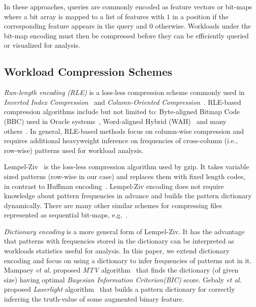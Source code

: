 In these approaches, queries are commonly encoded as feature vectors or bit-maps where a bit array is mapped to a list of features with $1$ in a position if the corresponding feature appears in the query and $0$ otherwise.
Workloads under the bit-map encoding must then be compressed before they can be efficiently queried or visualized for analysis. 
\subsection{Workload Compression Schemes}
\textit{Run-length encoding (RLE)} is a loss-less compression scheme commonly used in \textit{Inverted Index Compression}~\cite{DBLP:books/nostrand/WittenMT94,DBLP:journals/csur/ZobelM06} and \textit{Column-Oriented Compression}~\cite{DBLP:conf/sigmod/AbadiMF06}.
RLE-based compression algorithms include but not limited to: Byte-aligned Bitmap Code (BBC) used in Oracle systems~\cite{DBLP:journals/vldb/AntoshenkovZ96}, Word-aligned Hybrid (WAH)~\cite{DBLP:conf/ssdbm/WuOS02} and many others~\cite{DBLP:journals/acj/MoffatZ94,DBLP:conf/vldb/JohnsonA00,Antoshenkov:1995:BBC:874051.874730}.
In general, RLE-based methods focus on column-wise compression and requires additional heavyweight inference on frequencies of cross-column (i.e., row-wise) patterns used for workload analysis.

Lempel-Ziv~\cite{DBLP:journals/tit/ZivL77,DBLP:journals/tit/ZivL78} is the loss-less compression algorithm used by gzip.
It takes variable sized patterns (row-wise in our case) and replaces them with fixed length codes, in contrast to Huffman encoding~\cite{4051119}. 
Lempel-Ziv encoding does not require knowledge about pattern frequencies in advance and builds the pattern dictionary dynamically. 
There are many other similar schemes for compressing files represented as sequential bit-maps, e.g.~\cite{DBLP:conf/adbis/SkibinskiS07a}.

\textit{Dictionary encoding} is a more general form of Lempel-Ziv.
It has the advantage that patterns with frequencies stored in the dictionary can be interpreted as workloads statistics useful for analysis.
In this paper, we extend dictionary encoding and focus on using a dictionary to infer frequencies of patterns not in it.
Mampaey \textit{et al.} proposed \textit{MTV} algorithm~\cite{DBLP:journals/tkdd/MampaeyVT12} that finds the dictionary (of given size) having optimal \textit{Bayesian Information Criterion(BIC)} score.
Gebaly \textit{et al.} proposed \textit{Laserlight} algorithm~\cite{DBLP:journals/pvldb/GebalyAGKS14} that builds a pattern dictionary for correctly inferring the truth-value of some augmented binary feature.

